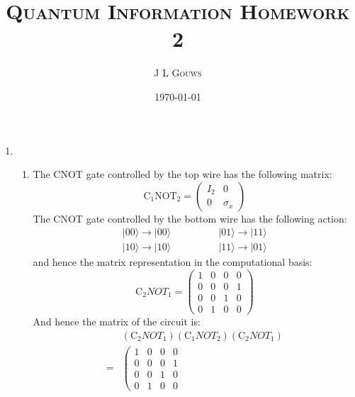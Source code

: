 \documentclass[12pt,a4]{article}
\title{
  \textsc{Quantum Information Homework 2}
}
\author{\textsc{J L Gouws}
}
\date{\today
\\[1cm]}
\begin{document}
\thispagestyle{empty}

\maketitle

\begin{enumerate}
  \item
    \begin{enumerate}
      \item
        The CNOT gate controlled by the top wire  has the following matrix:
        \begin{equation*}
          \text{C}_1\text{NOT}_2 =
          \left(
            \begin{matrix}
              I_2 & 0\\
              0   & \sigma_x
            \end{matrix}
          \right)
        \end{equation*}
        The CNOT gate controlled by the bottom wire has the following action:
        \begin{align*}
          | 00 \rangle \to |00\rangle & \qquad \qquad | 01 \rangle \to | 11 \rangle\\
          | 10 \rangle \to |10\rangle & \qquad \qquad | 11 \rangle \to | 01 \rangle
        \end{align*}
        and hence the matrix representation in the computational basis:
        \begin{equation*}
          \text{C}_2{NOT}_1 =
          \left(
            \begin{matrix}
              1 & 0 & 0 & 0\\
              0 & 0 & 0 & 1\\
              0 & 0 & 1 & 0\\
              0 & 1 & 0 & 0
            \end{matrix}
          \right)
        \end{equation*}
        And hence the matrix of the circuit is:
        \begin{align*}
            & (\text{C}_2{NOT}_1)( \text{C}_1{NOT}_2)( \text{C}_2{NOT}_1)\\
          = &
          \left(
            \begin{matrix}
              1 & 0 & 0 & 0\\
              0 & 0 & 0 & 1\\
              0 & 0 & 1 & 0\\
              0 & 1 & 0 & 0

\end{matrix}
\end{align*}
\end{enumerate}
\end{enumerate}
\end{document}
